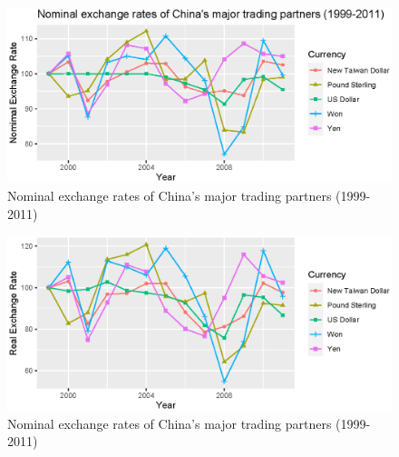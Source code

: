 \begin{figure}[htbp]
	\centering
	\includegraphics[width=1\textwidth]{figure/figure1.eps}
	\caption{Nominal exchange rates of China's major trading partners (1999-2011)}
	\label{fig3.1}
\end{figure}

\begin{figure}[htbp]
	\centering
	\includegraphics[width=1\textwidth]{figure/figure2.eps}
	\caption{Nominal exchange rates of China's major trading partners (1999-2011)}
	\label{fig3.2}
\end{figure}
